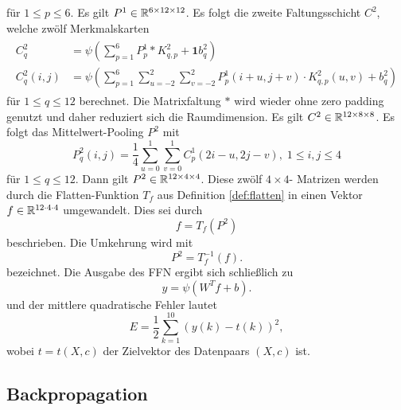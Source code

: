für $1 \leq p \leq 6$. Es gilt $P^1 \in \mathbb{R}^{6 \times 12 \times 12}$. Es folgt die zweite Faltungsschicht $C^2$, welche zwölf Merkmalskarten
\begin{align*}
    \label{eq:C2_forw}
    \begin{split}
        C_q^2 &= \psi \left( \sum_{p=1}^6 P_p^1 \ast K_{q,p}^2 + \mathbf{1} b_q^2\right) \\
        C_q^2(i,j) &= \psi \left( \sum_{p=1}^6 \sum_{u=-2}^2 \sum_{v=-2}^2 P^1_p(i+u,j+v) \cdot K^2_{q,p}(u,v) +b_q^2\right)
    \end{split}
\end{align*}
für $1 \leq q \leq 12$ berechnet. Die Matrixfaltung $\ast$ wird wieder ohne zero padding genutzt und daher reduziert sich die Raumdimension.
Es gilt $C^2 \in \mathbb{R}^{12 \times 8 \times 8}$. Es folgt das Mittelwert-Pooling $P^2$ mit
\begin{equation*}
    \label{eq:P2_forw}
    P_q^2(i,j)= \frac{1}{4} \sum_{u=0}^1 \sum_{v=0}^1 C_p^1(2i-u, 2j-v), \; 1 \leq i,j \leq 4
\end{equation*}
für $1 \leq q \leq 12$. Dann gilt $P^2\in \mathbb{R}^{12 \times 4 \times 4}$. Diese zwölf $4 \times 4$- Matrizen werden durch die Flatten-Funktion $T_f$ aus Definition \ref{def:flatten} in einen Vektor $f \in \mathbb{R}^{12 \cdot 4 \cdot 4}$ umgewandelt. Dies sei durch
\begin{equation*}
    \label{eq:f_forw}
    f=T_f(P^2)
\end{equation*}
beschrieben. 
Die Umkehrung wird mit
\begin{equation*}
    \label{eq_f_ford_inv}
    P^2=T_f^{-1}(f).
\end{equation*}
bezeichnet.
Die Ausgabe des FFN ergibt sich schließlich zu
\begin{equation*}
    \label{eq:y_forw}
    y=\psi(W^T f +b).
\end{equation*}
und der mittlere quadratische Fehler lautet
\begin{equation*}
    \label{eq:E_forw}
    E=\frac{1}{2} \sum_{k=1}^{10} \left(y(k)-t(k)\right)^2,
\end{equation*}
wobei $t=t(X,c)$ der Zielvektor des Datenpaars $(X,c)$ ist.

\subsection*{Backpropagation}

